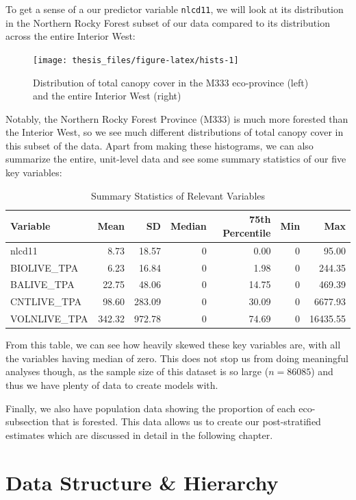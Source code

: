 \documentclass[12pt,twoside]{reedthesis}
\begin{document}
To get a sense of a our predictor variable \texttt{nlcd11}, we will look at its distribution in the Northern Rocky Forest subset of our data compared to its distribution across the entire Interior West:
\begin{figure}

{\centering \texttt{[image: thesis\_files/figure-latex/hists-1]} 

}

\caption[Total canopy cover in the M333 eco-province and Interior West]{Distribution of total canopy cover in the M333 eco-province (left) and the entire Interior West (right)}\label{fig:hists}
\end{figure}
Notably, the Northern Rocky Forest Province (M333) is much more forested than the Interior West, so we see much different distributions of total canopy cover in this subset of the data. Apart from making these histograms, we can also summarize the entire, unit-level data and see some summary statistics of our five key variables:
\begin{longtable}[t]{lrrrrrr}
\caption[Summary Statistics of Relevant Variables]{\label{tab:var-tab}Summary Statistics of Relevant Variables}\\
\toprule
Variable & Mean & SD & Median & 75th Percentile & Min & Max\\
\midrule
nlcd11 & 8.73 & 18.57 & 0 & 0.00 & 0 & 95.00\\
BIOLIVE\_TPA & 6.23 & 16.84 & 0 & 1.98 & 0 & 244.35\\
BALIVE\_TPA & 22.75 & 48.06 & 0 & 14.75 & 0 & 469.39\\
CNTLIVE\_TPA & 98.60 & 283.09 & 0 & 30.09 & 0 & 6677.93\\
VOLNLIVE\_TPA & 342.32 & 972.78 & 0 & 74.69 & 0 & 16435.55\\
\bottomrule
\end{longtable}
From this table, we can see how heavily skewed these key variables are, with all the variables having median of zero. This does not stop us from doing meaningful analyses though, as the sample size of this dataset is so large (\(n = 86085\)) and thus we have plenty of data to create models with.

Finally, we also have population data showing the proportion of each eco-subsection that is forested. This data allows us to create our post-stratified estimates which are discussed in detail in the following chapter.

\hypertarget{data-structure-hierarchy}{%
\section{Data Structure \& Hierarchy}\label{data-structure-hierarchy}}
\end{document}
